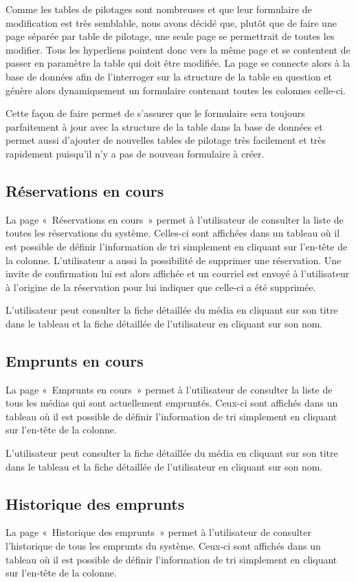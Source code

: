 \documentclass[letter, 11pt]{report}
\begin{document}
Comme les tables de pilotages sont nombreuses et que leur formulaire de modification est très semblable, nous avons décidé que, plutôt que de faire une page séparée par table de pilotage, une seule page se permettrait de toutes les modifier. Tous les hyperliens pointent donc vers la même page et se contentent de passer en paramètre la table qui doit être modifiée. La page se connecte alors à la base de données afin de l'interroger sur la structure de la table en question et génère alors dynamiquement un formulaire contenant toutes les colonnes celle-ci.

Cette façon de faire permet de s'assurer que le formulaire sera toujours parfaitement à jour avec la structure de la table dans la base de données et permet aussi d'ajouter de nouvelles tables de pilotage très facilement et très rapidement puisqu'il n'y a pas de nouveau formulaire à créer.

\subsection{Réservations en cours}
La page «~Réservations en cours~» permet à l'utilisateur de consulter la liste de toutes les réservations du système. Celles-ci sont affichées dans un tableau où il est possible de définir l'information de tri simplement en cliquant sur l'en-tête de la colonne. L'utilisateur a aussi la possibilité de supprimer une réservation. Une invite de confirmation lui est alors affichée et un courriel est envoyé à l'utilisateur à l'origine de la réservation pour lui indiquer que celle-ci a été supprimée.

L'utilisateur peut consulter la fiche détaillée du média en cliquant sur son titre dans le tableau et la fiche détaillée de l'utilisateur en cliquant sur son nom.

\subsection{Emprunts en cours}
La page «~Emprunts en cours~» permet à l'utilisateur de consulter la liste de tous les médias qui sont actuellement empruntés. Ceux-ci sont affichés dans un tableau où il est possible de définir l'information de tri simplement en cliquant sur l'en-tête de la colonne.

L'utilisateur peut consulter la fiche détaillée du média en cliquant sur son titre dans le tableau et la fiche détaillée de l'utilisateur en cliquant sur son nom.

\subsection{Historique des emprunts}
La page «~Historique des emprunts~» permet à l'utilisateur de consulter l'historique de tous les emprunts du système. Ceux-ci sont affichés dans un tableau où il est possible de définir l'information de tri simplement en cliquant sur l'en-tête de la colonne.
\end{document}
